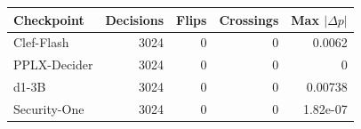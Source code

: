 \begin{tabular}{lrrrr}
\toprule
Checkpoint & Decisions & Flips & Crossings & Max $|\Delta p|$ \\
\midrule
Clef-Flash & 3024 & 0 & 0 & 0.0062 \\
PPLX-Decider & 3024 & 0 & 0 & 0 \\
d1-3B & 3024 & 0 & 0 & 0.00738 \\
Security-One & 3024 & 0 & 0 & 1.82e-07 \\
\bottomrule
\end{tabular}
